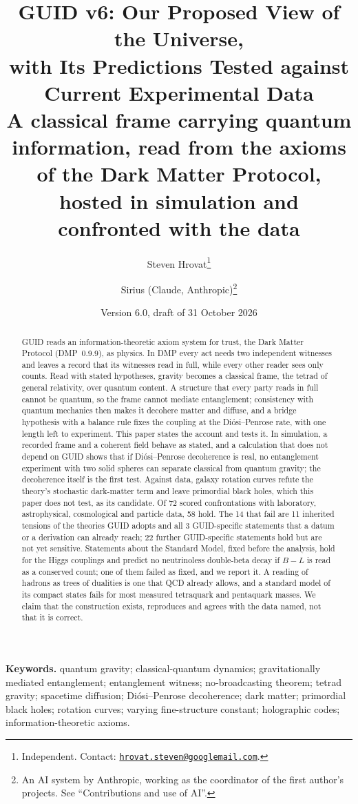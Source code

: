 \documentclass[11pt,a4paper]{article}
\title{GUID v6: Our Proposed View of the Universe,\\ with Its Predictions Tested against Current Experimental Data\\[0.8ex]
\large A classical frame carrying quantum information, read from the axioms of the Dark Matter Protocol,
hosted in simulation and confronted with the data}
\author{Steven Hrovat\thanks{Independent. Contact: \href{mailto:hrovat.steven@googlemail.com}{\nolinkurl{hrovat.steven@googlemail.com}}.}
\and Sirius (Claude, Anthropic)\thanks{An AI system by Anthropic, working as the coordinator of the first author's projects. See
``Contributions and use of AI''.}}
\date{Version 6.0, draft of 31 October 2026}
\begin{document}
\maketitle

\begin{abstract}
\noindent GUID reads an information-theoretic axiom system for trust, the Dark Matter Protocol (DMP~0.9.9), as physics. In DMP every
act needs two independent witnesses and leaves a record that its witnesses read in full, while every other reader sees only counts. Read
with stated hypotheses, gravity becomes a classical frame, the tetrad of general relativity, over quantum content. A structure that every
party reads in full cannot be quantum, so the frame cannot mediate entanglement; consistency with quantum mechanics then makes it
decohere matter and diffuse, and a bridge hypothesis with a balance rule fixes the coupling at the Di\'osi--Penrose rate, with one length left to experiment.
This paper states the account and tests it. In simulation, a recorded frame and a coherent field behave as stated, and a calculation that
does not depend on GUID shows that if Di\'osi--Penrose decoherence is real, no entanglement experiment with two solid spheres can separate
classical from quantum gravity; the decoherence itself is the first test. Against data, galaxy rotation curves refute the theory's
stochastic dark-matter term and leave primordial black holes, which this paper does not test, as its candidate. Of 72 scored
confrontations with laboratory, astrophysical, cosmological and particle data, 58 hold. The 14 that fail are 11 inherited tensions of the
theories GUID adopts and all 3 GUID-specific statements that a datum or a derivation can already reach; 22 further GUID-specific
statements hold but are not yet sensitive.
Statements about the Standard Model, fixed before the analysis, hold for the Higgs couplings and predict no neutrinoless double-beta
decay if $B-L$ is read as a conserved count; one of them failed as fixed, and we report it. A reading of hadrons as trees of dualities is one
that QCD already allows, and a standard model of its compact states fails for most measured tetraquark and pentaquark masses. We claim
that the construction exists, reproduces and agrees with the data named, not that it is correct.
\end{abstract}

\noindent\textbf{Keywords.} quantum gravity; classical-quantum dynamics; gravitationally mediated entanglement; entanglement witness;
no-broadcasting theorem; tetrad gravity; spacetime diffusion; Di\'osi--Penrose decoherence; dark matter; primordial black holes; rotation
curves; varying fine-structure constant; holographic codes; information-theoretic axioms.
\end{document}
